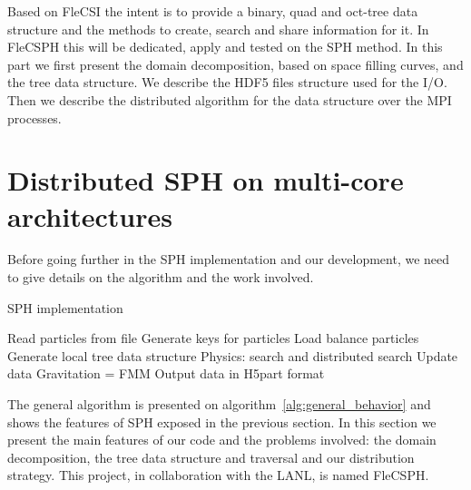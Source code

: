 Based on FleCSI the intent is to provide a binary, quad and oct-tree data structure and the methods to create, search and share information for it. 
In FleCSPH this will be dedicated, apply and tested on the SPH method. 
In this part we first present the domain decomposition, based on space filling curves, and the tree data structure.
We describe the HDF5 files structure used for the I/O.
Then we describe the distributed algorithm for the data structure over the MPI processes. 

\section{Distributed SPH on multi-core architectures}
Before going further in the SPH implementation and our development, we need to give details on the algorithm and the work involved. 
%
\begin{algorithm}
\caption{SPH implementation}\label{alg:general_behavior}
\begin{algorithmic}[1]
\State Read particles from file 
\State Generate keys for particles 
\State Load balance particles 
\State Generate local tree data structure
\State Physics: search and distributed search
\State Update data 
\EndWhile
\State Gravitation = FMM
\State Output data in H5part format
\EndIf
\EndWhile
\end{algorithmic}
\end{algorithm}
%
The general algorithm is presented on algorithm~\ref{alg:general_behavior} and shows the features of SPH exposed in the previous section. 
In this section we present the main features of our code and the problems involved: the domain decomposition, the tree data structure and traversal and our distribution strategy. 
This project, in collaboration with the LANL, is named FleCSPH. 

